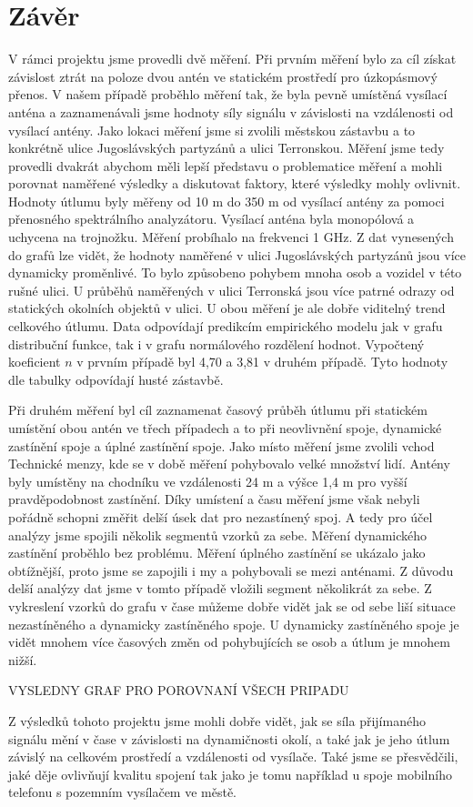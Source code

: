 \chapter*{Závěr} %
V rámci projektu jsme provedli dvě měření. Při prvním měření bylo za cíl získat závislost ztrát na poloze dvou antén ve statickém prostředí pro úzkopásmový přenos. V našem případě proběhlo měření tak, že byla pevně umístěná vysílací anténa a zaznamenávali jsme hodnoty síly signálu v závislosti na vzdálenosti od vysílací antény. Jako lokaci měření jsme si zvolili městskou zástavbu a to konkrétně ulice Jugoslávských partyzánů a ulici Terronskou. Měření jsme tedy provedli dvakrát abychom měli lepší představu o problematice měření a mohli porovnat naměřené výsledky a diskutovat faktory, které výsledky mohly ovlivnit.
Hodnoty útlumu byly měřeny od 10 m do 350 m od vysílací antény za pomoci přenosného spektrálního analyzátoru. Vysílací anténa byla monopólová a uchycena na trojnožku. Měření probíhalo na frekvenci 1 GHz. 
Z dat vynesených do grafů lze vidět, že hodnoty naměřené v ulici Jugoslávských partyzánů jsou více dynamicky proměnlivé. To bylo způsobeno pohybem mnoha osob a vozidel v této rušné ulici. U průběhů naměřených v ulici Terronská jsou více patrné odrazy od statických okolních objektů v ulici. U obou měření je ale dobře viditelný trend celkového útlumu. Data odpovídají predikcím empirického modelu jak v grafu distribuční funkce, tak i v grafu normálového rozdělení hodnot. Vypočtený koeficient $n$ v prvním případě byl 4,70 a 3,81 v druhém případě. Tyto hodnoty dle tabulky odpovídají husté zástavbě.

Při druhém měření byl cíl zaznamenat časový průběh útlumu při statickém umístění obou antén ve třech případech a to při neovlivnění spoje, dynamické zastínění spoje a úplné zastínění spoje. 
Jako místo měření jsme zvolili vchod Technické menzy, kde se v době měření pohybovalo velké množství lidí. Antény byly umístěny na chodníku ve vzdálenosti 24 m a výšce 1,4 m pro vyšší pravděpodobnost zastínění. 
Díky umístení a času měření jsme však nebyli pořádně schopni změřit delší úsek dat pro nezastínený spoj. A tedy pro účel analýzy jsme spojili několik segmentů vzorků za sebe. Měření dynamického zastínění proběhlo bez problému. Měření úplného zastínění se ukázalo jako obtížnější, proto jsme se zapojili i my a pohybovali se mezi anténami. Z důvodu delší analýzy dat jsme v tomto případě vložili segment několikrát za sebe. 
Z vykreslení vzorků do grafu v čase můžeme dobře vidět jak se od sebe liší situace nezastíněného a dynamicky zastíněného spoje. U dynamicky zastíněného spoje je vidět mnohem více časových změn od pohybujících se osob a útlum je mnohem nižší.

VYSLEDNY GRAF PRO POROVNANÍ VŠECH PRIPADU

Z výsledků tohoto projektu jsme mohli dobře vidět, jak se síla přijímaného signálu mění v čase v závislosti na dynamičnosti okolí, a také jak je jeho útlum závislý na celkovém prostředí a vzdálenosti od vysílače. Také jsme se přesvědčili, jaké děje ovlivňují kvalitu spojení tak jako je tomu například u spoje mobilního telefonu s pozemním vysílačem ve městě. 